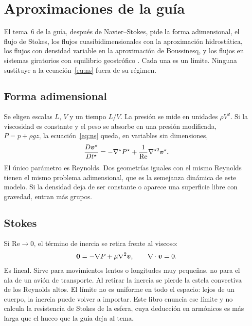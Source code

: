 \chapter{Aproximaciones de la guía}
\label{ch:aproximaciones}

El tema~6 de la guía, después de Navier--Stokes, pide la forma adimensional, el flujo de Stokes, los flujos cuasibidimensionales con la aproximación hidrostática, los flujos con densidad variable en la aproximación de Boussinesq, y los flujos en sistemas giratorios con equilibrio geostrófico \parencite{uleGuia2026}. Cada una es un límite. Ninguna sustituye a la ecuación~\eqref{eq:ns} fuera de su régimen.

\section{Forma adimensional}

Se eligen escalas \(L\), \(V\) y un tiempo \(L/V\). La presión se mide en unidades \(\rho V^2\). Si la viscosidad es constante y el peso se absorbe en una presión modificada, \(P=p+\rho g z\), la ecuación~\eqref{eq:ns} queda, en variables sin dimensiones,
\begin{equation}
\label{eq:ns-adim}
\frac{D\boldsymbol{v}^\star}{Dt^\star}=-\nabla^\star P^\star+\frac{1}{\mathrm{Re}}\nabla^{\star 2}\boldsymbol{v}^\star.
\end{equation}
El único parámetro es Reynolds. Dos geometrías iguales con el mismo Reynolds tienen el mismo problema adimensional, que es la semejanza dinámica de este modelo. Si la densidad deja de ser constante o aparece una superficie libre con gravedad, entran más grupos.

\section{Stokes}

Si \(\mathrm{Re}\to 0\), el término de inercia se retira frente al viscoso:
\begin{equation}
\label{eq:stokes-flow}
\boldsymbol{0}=-\nabla P+\mu\nabla^2\boldsymbol{v},
\qquad
\nabla\cdot\boldsymbol{v}=0.
\end{equation}
 Es lineal. Sirve para movimientos lentos o longitudes muy pequeñas, no para el ala de un avión de transporte. Al retirar la inercia se pierde la estela convectiva de los Reynolds altos. El límite no es uniforme en todo el espacio: lejos de un cuerpo, la inercia puede volver a importar. Este libro enuncia ese límite y no calcula la resistencia de Stokes de la esfera, cuya deducción en armónicos es más larga que el hueco que la guía deja al tema.

